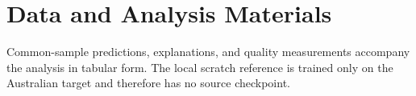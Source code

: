 \documentclass[runningheads]{venue/lncs/llncs}
\begin{document}
\section{Data and Analysis Materials}

Common-sample predictions, explanations, and quality measurements accompany the analysis in tabular form. The local scratch reference is trained only on the Australian target and therefore has no source checkpoint.



\end{document}
